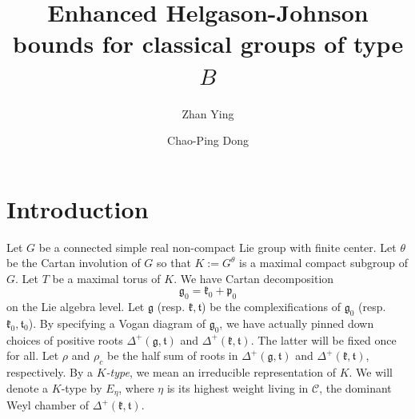 \documentclass[11pt]{amsart}
\theoremstyle{plain}
\theoremstyle{definition}
\newcommand{\frg}{\mathfrak{g}}
\newcommand{\frk}{\mathfrak{k}}
\newcommand{\frp}{\mathfrak{p}}
\newcommand{\frt}{\mathfrak{t}}
\begin{document}
\title[Enhanced Helgason-Johnson bounds for classical groups of type $B$]
{Enhanced Helgason-Johnson bounds for classical groups of type $B$}

\author{Zhan Ying}
\address[Ying]{School of Mathematical Sciences, Soochow University, Suzhou 215006,
P.~R.~China}


\author{Chao-Ping Dong}
\address[Dong]{School of Mathematical Sciences, Soochow University, Suzhou 215006,
P.~R.~China}










\endabstract





\maketitle


\section{Introduction}

Let $G$ be a connected simple real non-compact Lie group with finite center. Let $\theta$ be the Cartan involution of $G$ so that $K:=G^{\theta}$ is a maximal compact subgroup of $G$.
Let $T$ be a maximal torus of $K$.  We have Cartan decomposition
$$
\frg_0=\frk_0 + \frp_0
$$
on the Lie algebra level. Let $\frg$ (resp. $\frk, \frt$) be the complexifications of $\frg_0$ (resp. $\frk_0, \frt_0$). By specifying a Vogan diagram of $\frg_0$, we have actually pinned down choices of positive roots
$\Delta^+(\frg, \frt)$ and $\Delta^+(\frk, \frt)$. The latter will be fixed once for all.
Let $\rho$ and $\rho_c$ be the half sum of roots in $\Delta^+(\frg, \frt)$ and $\Delta^+(\frk, \frt)$, respectively. By a \emph{$K$-type}, we mean an irreducible representation of $K$. We will denote a $K$-type by $E_{\eta}$, where $\eta$ is its highest weight living in $\mathcal{C}$, the dominant Weyl chamber of $\Delta^+(\frk, \frt)$.
\end{document}
